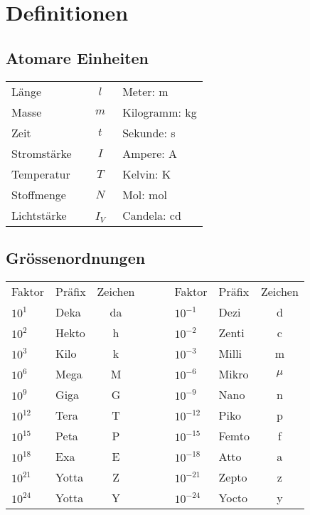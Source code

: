 \section{Definitionen}

\subsection{Atomare Einheiten}
\settowidth{\MyLenA}{Temperatur~~}
\begin{tabular}{lcl}
	Länge 		& $l$ & Meter: \si{\metre} \\
	Masse 		& $m$ & Kilogramm: \si{\kilogram}\\
	Zeit		& $t$ & Sekunde: \si{\second}\\
	Stromstärke 	& $I$ & Ampere: \si{\ampere}\\
	Temperatur	& $T$ & Kelvin: \si{\kelvin}\\
	Stoffmenge	& $N$ & Mol: \si{\mol}\\
	Lichtstärke~~	& ~$I_V$~ & Candela: \si{\candela}\\
\end{tabular}



\subsection{Grössenordnungen}
\settowidth{\MyLenA}{Temperatur~~}
\begin{center}
\begin{tabular}{llccllc}
	Faktor 	& Präfix & Zeichen & ~~~ & Faktor & Präfix & Zeichen \\\cline{1-3}\cline{5-7}
	$10^{1}$ & Deka & da &&	$10^{-1}$ & Dezi & d 		\\
	$10^{2}$ & Hekto & h&&		$10^{-2}$ & Zenti & c 	\\	
	$10^{3}$ & Kilo & k&&  	$10^{-3}$ & Milli & m 		\\
	$10^{6}$ & Mega & M&&  	$10^{-6}$ & Mikro & $\mu$ \\	
	$10^{9}$ & Giga & G&&  	$10^{-9}$ & Nano & n 	\\	
	$10^{12}$ & Tera & T&& 	$10^{-12}$ & Piko & p 	\\	
	$10^{15}$ & Peta & P&& 	$10^{-15}$ & Femto & f 	\\	
	$10^{18}$ & Exa & E&& 	$10^{-18}$ & Atto & a 	\\	
	$10^{21}$ & Yotta & Z&&	$10^{-21}$ & Zepto & z 	\\	
	$10^{24}$ & Yotta & Y&&	$10^{-24}$ & Yocto & y\\ 		
\end{tabular}
\end{center}

